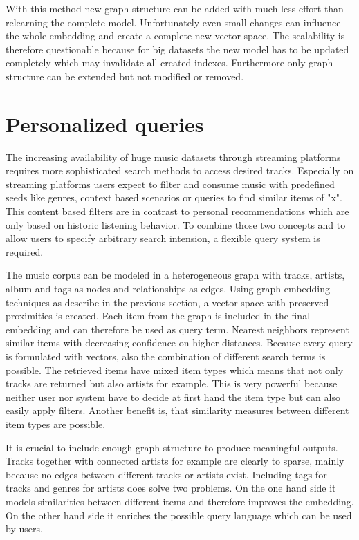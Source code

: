 \documentclass[sigconf]{acmart}
\begin{document}
With this method new graph structure can be added with much less effort than relearning the complete model. Unfortunately even small changes can influence the whole embedding and create a complete new vector space. The scalability is therefore questionable because for big datasets the new model has to be updated completely which may invalidate all created indexes. Furthermore only graph structure can be extended but not modified or removed.


\section{Personalized queries}
The increasing availability of huge music datasets through streaming platforms requires more sophisticated search methods to access desired tracks. Especially on streaming platforms users expect to filter and consume music with predefined seeds like genres, context based scenarios or queries to find similar items of "x". This content based filters are in contrast to personal recommendations which are only based on historic listening behavior. To combine those two concepts and to allow users to specify arbitrary search intension, a flexible query system is required.

The music corpus can be modeled in a heterogeneous graph with tracks, artists, album and tags as nodes and relationships as edges. Using graph embedding techniques as describe in the previous section, a vector space with preserved proximities is created. Each item from the graph is included in the final embedding and can therefore be used as query term. Nearest neighbors represent similar items with decreasing confidence on higher distances. Because every query is formulated with vectors, also the combination of different search terms is possible. The retrieved items have mixed item types which means that not only tracks are returned but also artists for example. This is very powerful because neither user nor system have to decide at first hand the item type but can also easily apply filters. Another benefit is, that similarity measures between different item types are possible.

It is crucial to include enough graph structure to produce meaningful outputs. Tracks together with connected artists for example are clearly to sparse, mainly because no edges between different tracks or artists exist. Including tags for tracks and genres for artists does solve two problems. On the one hand side it models similarities between different items and therefore improves the embedding. On the other hand side it enriches the possible query language which can be used by users. \\
\end{document}
